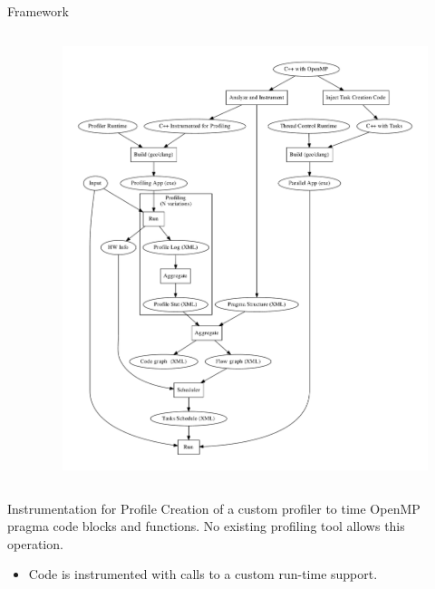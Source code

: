 \documentclass[xcolor=dvipsnames]{beamer}
\begin{document}
\begin{section}{Framework}
\begin{frame}{\hskip 0.3cm }
\begin{columns}
\begin{column}{6.5cm}
\end{column}
\begin{column}{3.5cm}
\vskip -1.5cm
\begin{figure}
\includegraphics[scale=0.15]{framework.pdf}
\end{figure}

\end{column}
\end{columns}
\end{frame}











\begin{frame}[fragile]{\hskip 0.3cm Instrumentation for Profile}
 Creation of a custom profiler to time OpenMP pragma code blocks and functions.  No existing profiling tool allows this operation.

\begin{itemize}

\item Code is instrumented with calls to a custom run-time support.


\end{itemize}
\end{frame}
\end{section}
\end{document}
